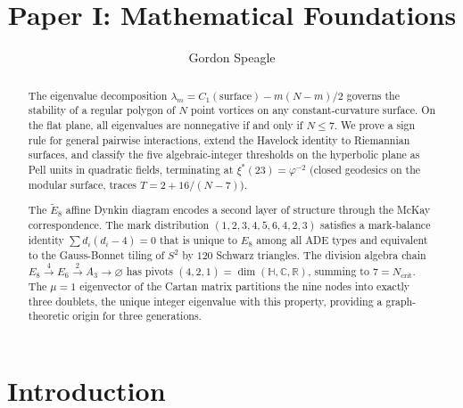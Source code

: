











\title{\seriestitle\\[6pt]\large Paper I: Mathematical Foundations}
\author{Gordon Speagle}
\date{}


\maketitle

\begin{abstract}
The eigenvalue decomposition
$\lambda_m = C_1(\text{surface}) - m(N{-}m)/2$ governs the
stability of a regular polygon of $N$ point vortices on any
constant-curvature surface.
On the flat plane, all eigenvalues are nonnegative if and only if
$N \le 7$.
We prove a sign rule for general pairwise interactions,
extend the Havelock identity to Riemannian surfaces, and
classify the five algebraic-integer thresholds on the
hyperbolic plane as Pell units in quadratic fields,
terminating at $\xi^*(23) = \varphi^{-2}$
(closed geodesics on the modular surface, traces
$T = 2 + 16/(N{-}7)$).

The $\tilde{E}_8$ affine Dynkin diagram encodes a second layer
of structure through the McKay correspondence.
The mark distribution $(1,2,3,4,5,6,4,2,3)$ satisfies a
mark-balance identity $\sum d_i(d_i - 4) = 0$ that is unique
to $E_8$ among all ADE types and equivalent to the
Gauss-Bonnet tiling of $S^2$ by $120$ Schwarz triangles.
The division algebra chain
$E_8 \xrightarrow{4} E_6 \xrightarrow{2} A_3 \to \varnothing$
has pivots $(4,2,1) = \dim(\mathbb{H}, \mathbb{C}, \mathbb{R})$,
summing to $7 = N_{\mathrm{crit}}$.
The $\mu = 1$ eigenvector of the Cartan matrix partitions the
nine nodes into exactly three doublets, the unique integer
eigenvalue with this property, providing a graph-theoretic
origin for three generations.
\end{abstract}


\section{Introduction}
\label{sec:intro}

